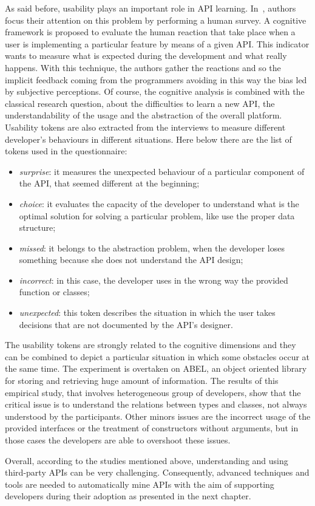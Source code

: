 \smallskip
As said before, usability plays an important role in API learning. 
In~\cite{marco_piccioni_empirical_2013},  authors focus their attention on this 
problem by performing a human survey. A cognitive framework is proposed to 
evaluate the human reaction that take place when a user is implementing a 
particular feature by means of a given API. This indicator wants to measure 
what is expected during the development and what really happens. With this 
technique, the authors gather the reactions and so the implicit feedback coming 
from the programmers avoiding in this way the bias led by subjective 
perceptions. Of course, the cognitive analysis is combined with the classical 
research question, about the difficulties to learn a new API, the 
understandability of the usage and the abstraction of the overall platform. 
Usability tokens are also extracted from the interviews to measure different 
developer's behaviours in different situations. Here below there are the list 
of tokens used in the questionnaire:

\begin{itemize}
	\item \textit{surprise}: it measures the unexpected behaviour of a 
	particular component of the API, that seemed different at the beginning;
	\item \textit{choice}: it evaluates the capacity of the developer to 
	understand what is the optimal solution for solving a particular problem, 
	like use the proper data structure;
	\item \textit{missed}: it belongs to the abstraction problem, when the 
	developer loses something because she does not understand the API design;
	\item \textit{incorrect}: in this case, the developer uses in the wrong way 
	the provided function or classes;
	\item \textit{unexpected}: this token describes the situation in which the 
	user takes decisions that are not documented by the API's designer.
\end{itemize}

The usability tokens are strongly related to the cognitive dimensions and they 
can be combined to depict a particular situation in which some obstacles occur 
at the same time. The experiment is overtaken on ABEL, an object oriented 
library for storing and retrieving huge amount of information. The results of 
this empirical study, that involves heterogeneous group of developers, show 
that the critical issue is to understand the relations between types and 
classes, not always understood by the participants. Other minors issues are the 
incorrect usage of the provided interfaces or the treatment of constructors 
without arguments, but in those cases the developers are able to overshoot 
these issues. 

Overall, according to the studies mentioned above, understanding and using 
third-party APIs can be very challenging. Consequently, advanced techniques and 
tools are needed to automatically mine APIs with the aim of supporting 
developers during their adoption as presented in the next chapter.
